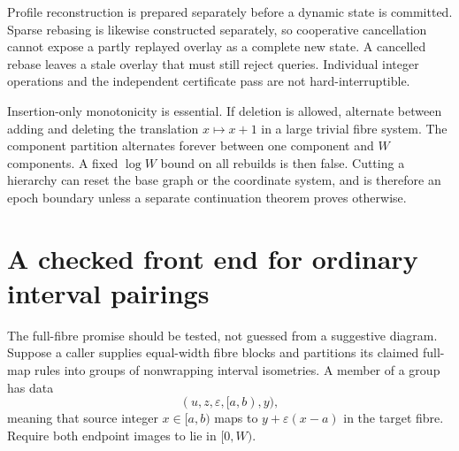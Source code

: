 \documentclass[11pt]{article}
\theoremstyle{definition}
\newcommand{\eps}{\varepsilon}
\begin{document}
Profile reconstruction is prepared separately before a dynamic state is committed. Sparse rebasing is likewise constructed separately, so cooperative cancellation cannot expose a partly replayed overlay as a complete new state. A cancelled rebase leaves a stale overlay that must still reject queries. Individual integer operations and the independent certificate pass are not hard-interruptible.

Insertion-only monotonicity is essential. If deletion is allowed, alternate between adding and deleting the translation $x\mapsto x+1$ in a large trivial fibre system. The component partition alternates forever between one component and $W$ components. A fixed $\log W$ bound on all rebuilds is then false. Cutting a hierarchy can reset the base graph or the coordinate system, and is therefore an epoch boundary unless a separate continuation theorem proves otherwise.

\section{A checked front end for ordinary interval pairings}
\label{sec:guard}

The full-fibre promise should be tested, not guessed from a suggestive diagram. Suppose a caller supplies equal-width fibre blocks and partitions its claimed full-map rules into groups of nonwrapping interval isometries. A member of a group has data
\[
 (u,z,\eps,[a,b),y),
\]
meaning that source integer $x\in[a,b)$ maps to $y+\eps(x-a)$ in the target fibre. Require both endpoint images to lie in $[0,W)$.
\end{document}
